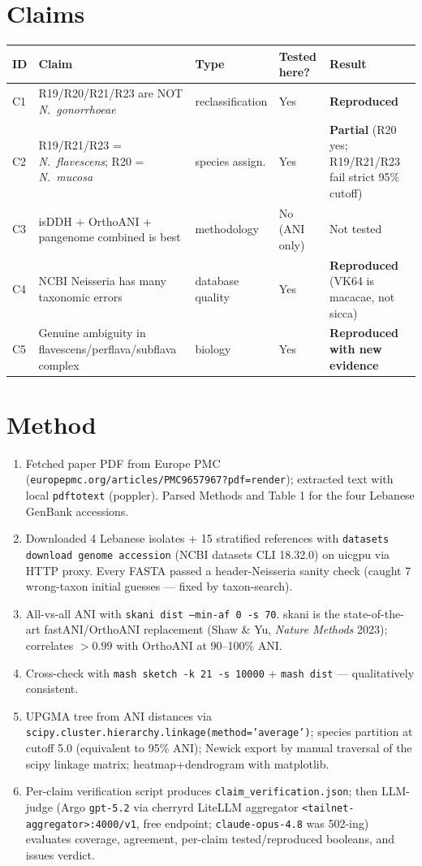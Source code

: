 \documentclass[11pt]{article}
\begin{document}
\section{Claims}

\begin{longtable}{@{}p{0.4cm}p{7.5cm}p{2.2cm}p{2.5cm}p{2.5cm}@{}}
\toprule
ID & Claim & Type & Tested here? & Result \\ \midrule \endhead
C1 & R19/R20/R21/R23 are NOT \emph{N.\ gonorrhoeae} & reclassification & Yes & \textbf{Reproduced} \\
C2 & R19/R21/R23 = \emph{N.\ flavescens}; R20 = \emph{N.\ mucosa} & species assign. & Yes & \textbf{Partial} (R20 yes; R19/R21/R23 fail strict 95\% cutoff) \\
C3 & isDDH + OrthoANI + pangenome combined is best & methodology & No (ANI only) & Not tested \\
C4 & NCBI Neisseria has many taxonomic errors & database quality & Yes & \textbf{Reproduced} (VK64 is macacae, not sicca) \\
C5 & Genuine ambiguity in flavescens/perflava/subflava complex & biology & Yes & \textbf{Reproduced with new evidence} \\
\bottomrule
\end{longtable}

\section{Method}

\begin{enumerate}
\item Fetched paper PDF from Europe PMC (\texttt{europepmc.org/articles/PMC9657967?pdf=render}); extracted text with local \texttt{pdftotext} (poppler). Parsed Methods and Table 1 for the four Lebanese GenBank accessions.
\item Downloaded 4 Lebanese isolates + 15 stratified references with \texttt{datasets download genome accession} (NCBI datasets CLI 18.32.0) on uicgpu via HTTP proxy. Every FASTA passed a header-Neisseria sanity check (caught 7 wrong-taxon initial guesses --- fixed by taxon-search).
\item All-vs-all ANI with \texttt{skani dist --min-af 0 -s 70}. skani is the state-of-the-art fastANI/OrthoANI replacement (Shaw \& Yu, \emph{Nature Methods} 2023); correlates $>0.99$ with OrthoANI at 90--100\% ANI.
\item Cross-check with \texttt{mash sketch -k 21 -s 10000} + \texttt{mash dist} --- qualitatively consistent.
\item UPGMA tree from ANI distances via \texttt{scipy.cluster.hierarchy.linkage(method='average')}; species partition at cutoff 5.0 (equivalent to 95\% ANI); Newick export by manual traversal of the scipy linkage matrix; heatmap+dendrogram with matplotlib.
\item Per-claim verification script produces \texttt{claim\_verification.json}; then LLM-judge (Argo \texttt{gpt-5.2} via cherryrd LiteLLM aggregator \texttt{<tailnet-aggregator>:4000/v1}, free endpoint; \texttt{claude-opus-4.8} was 502-ing) evaluates coverage, agreement, per-claim tested/reproduced booleans, and issues verdict.
\end{enumerate}
\end{document}
